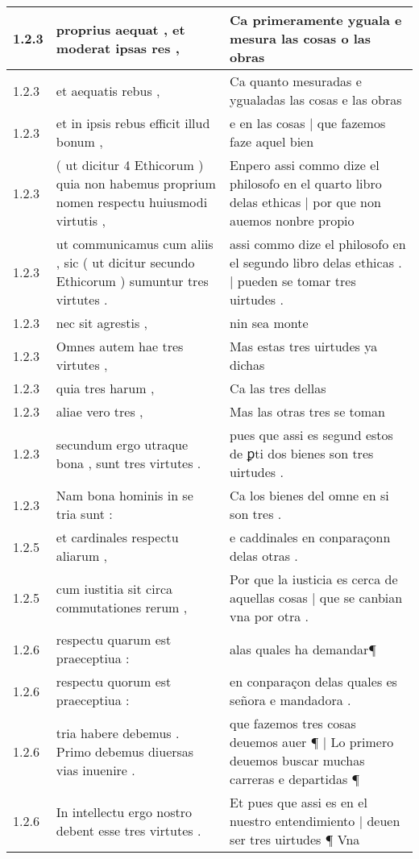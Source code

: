 \begin{tabular}{|p{1cm}|p{6.5cm}|p{6.5cm}|}
1.2.3 & proprius aequat , et moderat ipsas res , & Ca primeramente yguala e mesura las cosas o las obras \\\hline
1.2.3 & et aequatis rebus , & Ca quanto mesuradas e ygualadas las cosas e las obras \\\hline
1.2.3 & et in ipsis rebus efficit illud bonum , & e en las cosas | que fazemos faze aquel bien \\\hline
1.2.3 & ( ut dicitur 4 Ethicorum ) quia non habemus proprium nomen respectu huiusmodi virtutis , & Enpero assi commo dize el philosofo en el quarto libro delas ethicas | por que non auemos nonbre propio \\\hline
1.2.3 & ut communicamus cum aliis , sic ( ut dicitur secundo Ethicorum ) sumuntur tres virtutes . & assi commo dize el philosofo en el segundo libro delas ethicas . | pueden se tomar tres uirtudes . \\\hline
1.2.3 & nec sit agrestis , & nin sea monte \\\hline
1.2.3 & Omnes autem hae tres virtutes , & Mas estas tres uirtudes ya dichas \\\hline
1.2.3 & quia tres harum , & Ca las tres dellas \\\hline
1.2.3 & aliae vero tres , & Mas las otras tres se toman \\\hline
1.2.3 & secundum ergo utraque bona , sunt tres virtutes . & pues que assi es segund estos de ꝑti dos bienes son tres uirtudes . \\\hline
1.2.3 & Nam bona hominis in se tria sunt : & Ca los bienes del omne en si son tres . \\\hline
1.2.5 & et cardinales respectu aliarum , & e caddinales en conparaçonn delas otras . \\\hline
1.2.5 & cum iustitia sit circa commutationes rerum , & Por que la iusticia es cerca de aquellas cosas | que se canbian vna por otra . \\\hline
1.2.6 & respectu quarum est praeceptiua : & alas quales ha demandar¶ \\\hline
1.2.6 & respectu quorum est praeceptiua : & en conparaçon delas quales es señora e mandadora . \\\hline
1.2.6 & tria habere debemus . Primo debemus diuersas vias inuenire . & que fazemos tres cosas deuemos auer ¶ | Lo primero deuemos buscar muchas carreras e departidas ¶ \\\hline
1.2.6 & In intellectu ergo nostro debent esse tres virtutes . & Et pues que assi es en el nuestro entendimiento | deuen ser tres uirtudes ¶ Vna \\\hline

\end{tabular}
